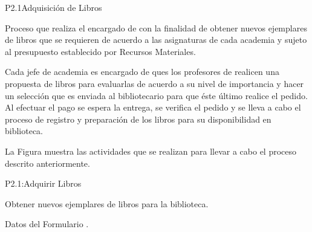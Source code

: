 
\begin{Proceso}{P2.1}{Adquisición de Libros} {
  

  Proceso que realiza el encargado de  con la finalidad de obtener nuevos ejemplares de libros que se requieren de acuerdo a las asignaturas de cada academia y sujeto al presupuesto establecido por Recursos Materiales. 
  
  Cada jefe de academia es encargado de ques los profesores de realicen una propuesta de libros para evaluarlas de acuerdo a su nivel de importancia y hacer un selección que es enviada al bibliotecario para que éste último realice el pedido. Al efectuar el pago se espera la entrega, se verifica el pedido y se lleva a cabo el proceso de registro y preparación de los libros para su disponibilidad en biblioteca.
  
  \newpage
  \noindent La Figura  muestra las actividades que se realizan para llevar a cabo el proceso descrito anteriormente.


} {P2.1:Adquirir Libros}

   { %
  }

   { %
    Obtener nuevos ejemplares de libros para la biblioteca.
  }

   { %
  	\begin{UClist}
  		\UCli Datos del Formulario . 
     	
    \end {UClist}
  }
  

\end{Proceso}
